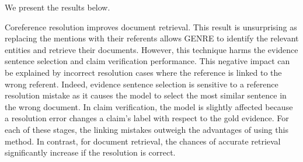 We present the results below.
\setcounter{table}{0}
\begin{table}[H]
\hspace{-0.2cm}
\smallskip
\caption{Impact of coreference resolution on each stage of the fact-checking process on DialFact \textsc{Dev}.}
\end{table}
Coreference resolution improves document retrieval. This result is unsurprising as replacing the mentions with their referents allows GENRE to identify the relevant entities and retrieve their documents. However, this technique harms the evidence sentence selection and claim verification performance. This negative impact can be explained by incorrect resolution cases where the reference is linked to the wrong referent. Indeed, evidence sentence selection is sensitive to a reference resolution mistake as it causes the model to select the most similar sentence in the wrong document. In claim verification, the model is slightly affected because a resolution error changes a claim's label with respect to the gold evidence. For each of these stages, the linking mistakes outweigh the advantages of using this method. In contrast, for document retrieval, the chances of accurate retrieval significantly increase if the resolution is correct.
